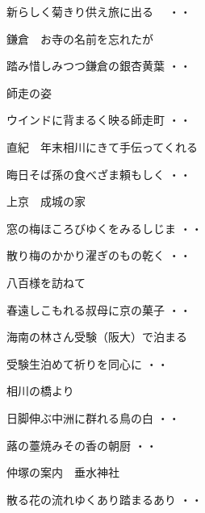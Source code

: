 \begin{shiika}新らしく菊きり供え旅に出る　
\hfill{・・}\end{shiika}
\vspace{0.6cm}
鎌倉　お寺の名前を忘れたが
\begin{shiika}踏み惜しみつつ鎌倉の銀杏黄葉
\hfill{・・}\end{shiika}
\vspace{0.6cm}
師走の姿
\begin{shiika}ウインドに背まるく映る師走町
\hfill{・・}\end{shiika}
\vspace{0.6cm}
直紀　年末相川にきて手伝ってくれる
\begin{shiika}晦日そば孫の食べざま頼もしく
\hfill{・・}\end{shiika}
\vspace{0.6cm}
上京　成城の家
\begin{shiika}窓の梅ほころびゆくをみるしじま
\hfill{・・}\end{shiika}
\begin{shiika}散り梅のかかり濯ぎのもの乾く
\hfill{・・}\end{shiika}
\vspace{0.6cm}
八百様を訪ねて
\begin{shiika}春遠しこもれる叔母に京の菓子
\hfill{・・}\end{shiika}
\vspace{0.6cm}
海南の林さん受験（阪大）で泊まる
\begin{shiika}受験生泊めて祈りを同心に
\hfill{・・}\end{shiika}
\vspace{0.6cm}
相川の橋より
\begin{shiika}日脚伸ぶ中洲に群れる鳥の白
\hfill{・・}\end{shiika}
\begin{shiika}蕗の薹焼みその香の朝厨
\hfill{・・}\end{shiika}
\vspace{0.6cm}
仲塚の案内　垂水神社
\begin{shiika}散る花の流れゆくあり踏まるあり
\hfill{・・}\end{shiika}
